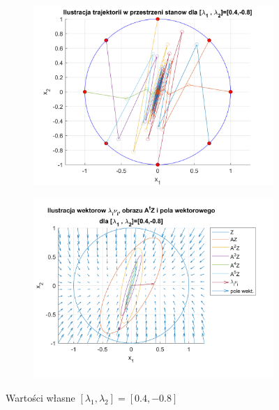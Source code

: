 \documentclass{article}
\begin{document}
\begin{figure}[H]
    \centering
    \begin{subfigure}{0.44\textwidth}
        \includegraphics[width=\textwidth]{portret_fazowy_4_-8.png}
    \end{subfigure}
    \begin{subfigure}{0.48\textwidth}
        \includegraphics[width=\textwidth]{pole_wektorowe_4_-8.png}
    \end{subfigure}
    \caption{Warto\'sci własne $[ \lambda_1, \lambda_2 ]= [ 0.4, -0.8 ]$}
    \label{fig::4i-8}
\end{figure}
\end{document}
